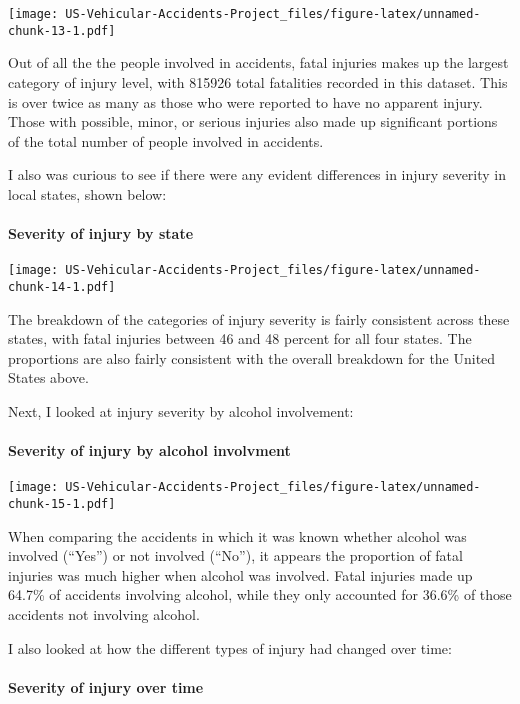 \documentclass[]{article}
\let\oldparagraph\paragraph
\renewcommand{\paragraph}[1]{\oldparagraph{#1}\mbox{}}
\begin{document}
\texttt{[image: US-Vehicular-Accidents-Project\_files/figure-latex/unnamed-chunk-13-1.pdf]}

Out of all the the people involved in accidents, fatal injuries makes up
the largest category of injury level, with 815926 total fatalities
recorded in this dataset. This is over twice as many as those who were
reported to have no apparent injury. Those with possible, minor, or
serious injuries also made up significant portions of the total number
of people involved in accidents.

I also was curious to see if there were any evident differences in
injury severity in local states, shown below:

\hypertarget{severity-of-injury-by-state}{%
\paragraph{Severity of injury by
state}\label{severity-of-injury-by-state}}

\texttt{[image: US-Vehicular-Accidents-Project\_files/figure-latex/unnamed-chunk-14-1.pdf]}

The breakdown of the categories of injury severity is fairly consistent
across these states, with fatal injuries between 46 and 48 percent for
all four states. The proportions are also fairly consistent with the
overall breakdown for the United States above.

Next, I looked at injury severity by alcohol involvement:

\hypertarget{severity-of-injury-by-alcohol-involvment}{%
\paragraph{Severity of injury by alcohol
involvment}\label{severity-of-injury-by-alcohol-involvment}}

\texttt{[image: US-Vehicular-Accidents-Project\_files/figure-latex/unnamed-chunk-15-1.pdf]}

When comparing the accidents in which it was known whether alcohol was
involved (``Yes'') or not involved (``No''), it appears the proportion
of fatal injuries was much higher when alcohol was involved. Fatal
injuries made up 64.7\% of accidents involving alcohol, while they only
accounted for 36.6\% of those accidents not involving alcohol.

I also looked at how the different types of injury had changed over
time:

\hypertarget{severity-of-injury-over-time}{%
\paragraph{Severity of injury over
time}\label{severity-of-injury-over-time}}
\end{document}
